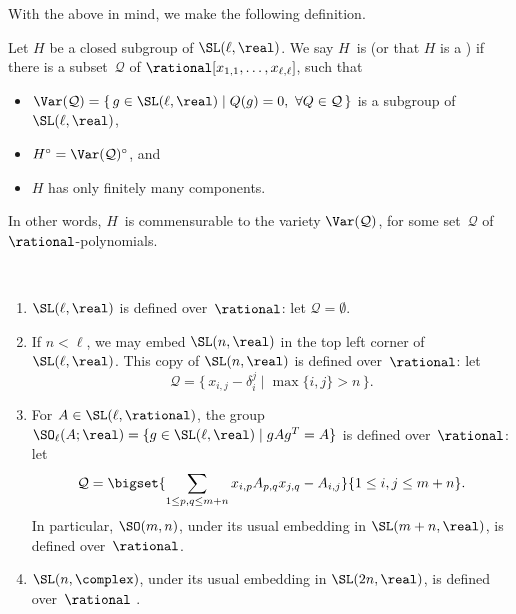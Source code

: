 With the above  in mind, we make the following
definition.

\begin{defn} \label{DefdQDefn}
 Let $H$ be a closed subgroup of $\SL(\ell,\real)$. We say
 $H$~is  (or that $H$ is a
) if there is a
subset~$\mathcal{Q}$ of $\rational[x_{1,1}, \ldots,
x_{\ell,\ell}]$, such that 
 \begin{itemize}
 \item {}
 $\Var(\mathcal{Q}) = \{\, g \in \SL(\ell,\real) \mid
Q(g) = 0, \ \forall Q \in \mathcal{Q} \,\}$ is a subgroup of
$\SL(\ell,\real)$,
 \item $H^\circ = \Var(\mathcal{Q})^\circ$, and
 \item $H$ has only finitely many components.
 \end{itemize}
 In other words, $H$~is commensurable to the variety
$\Var(\mathcal{Q})$, for some set~$\mathcal{Q}$ of
$\rational$-polynomials.
 \end{defn}

\begin{egs} \ 
\noprelistbreak
 \begin{enumerate}
 \item $\SL(\ell,\real)$ is defined over~$\rational$: let
$\mathcal{Q} = \emptyset$.
 \item If $n < \ell$, we may embed $\SL(n,\real)$ in the top
left corner of $\SL(\ell,\real)$. This copy of $\SL(n,\real)$ is defined over~$\rational$: let
 $$ \mathcal{Q} = 
 \{\, x_{i,j} - \delta_i^j \mid \max\{i,j\} > n \,\} .$$
 \item For $A \in \SL(\ell,\rational)$, 
 the group 
 $\SO_\ell(A; \real) = \{ g \in \SL(\ell,\real) \mid g A g^T = A \}$ %
 is defined over~$\rational$: let 
 $$ \mathcal{Q} =
 \bigset{
 \sum_{1\le p,q \le m+n}
 x_{i,p} A_{p,q} x_{j,q}
 - A_{i,j}
 }{1 \le i,j \le m+n}
 .$$
 In particular, $\SO(m,n)$, under its usual embedding in
$\SL(m+n,\real)$, is defined over~$\rational$.
 \item $\SL(n,\complex)$, under its usual embedding in
$\SL(2n,\real)$, is defined over~$\rational$
.
 \end{enumerate}
 \end{egs}

